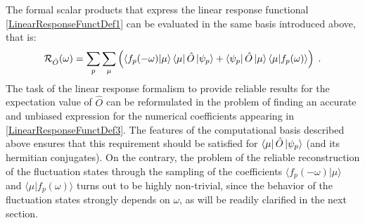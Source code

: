 \documentclass[a4paper]{article}
\newcommand{\be}{\begin{equation}}
\newcommand{\ee}{\end{equation}}
\newcommand{\lb}{\label}
\newcommand{\op}[1]{\hat {#1}}
\newcommand{\brket}[2]{\langle  #1 | #2 \rangle} %
\begin{document}
The formal scalar products that express the linear response functional \eqref{LinearResponseFunctDef1} can be evaluated in the same basis introduced above, that is: 
\be\lb{LinearResponseFunctDef3}
{\cal R}_{\op O}(\omega) = 
\sum_p\sum_\mu\left(\brket{f_p(-\omega)}{\mu}\bra{\mu}\op O\ket{\psi_p} + \bra{\psi_p}\op O\ket{\mu}\brket{\mu}{f_p(\omega)}\right) \;.
\ee
The task of the linear response formalism to provide reliable results for the expectation value of $\op O$ can be reformulated in the problem of finding an accurate and unbiased
expression for the numerical coefficients appearing in \eqref{LinearResponseFunctDef3}. The features of the computational basis described above ensures that this requirement should
be satisfied for $\bra{\mu}\op O\ket{\psi_p}$ (and its hermitian conjugates). 
On the contrary, the problem of the reliable reconstruction of the fluctuation states through the sampling of the coefficients $\brket{f_p(-\omega)}{\mu}$ and $\brket{\mu}{f_p(\omega)}$
turns out to be highly non-trivial, since the behavior of the fluctuation states strongly depends on $\omega$, as will be readily clarified in the next section.






% 
\end{document}
